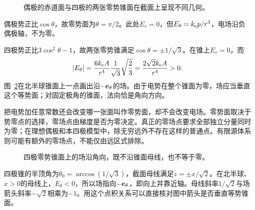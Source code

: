 \begin{figure}[H]\centering
{}
\caption{偶极的赤道面与四极的两张零势锥面在截面上呈现不同几何。}\label{fig:es1-e10-q}
\end{figure}
\begin{solution}
偶极势正比$\cos\theta$，故零势面为$\theta=\pi/2$。此处$E_r=0$，但$E_\theta=k_{\rm e} p/r^3$，电场沿负偶极轴，不为零。

四极势正比$3\cos^2\theta-1$，故两张零势锥满足$\cos\theta=\pm1/\sqrt3$。在锥上$E_r=0$，而
\[|E_\theta|=\frac{6k_{\rm e} A}{r^4}\frac1{\sqrt3}\sqrt{\frac23}
=\frac{2\sqrt2k_{\rm e} A}{r^4}>0.\]
图~\ref{fig:es1-e10-s}在北半球锥面上一点画出沿$-\bm{e}_\theta$的场。由于电势在整个锥面为零，场应当垂直这个等势面；对固定极角的锥面，法向恰是角向方向。

把电势加任意常数还会改变哪一张面叫作零势面，却不会改变电场。零势面取决于势零点的选择，零场点由梯度是否为零决定。真正的零场点要求全部独立分量同时为零；在理想偶极和本四极模型中，除无穷远外不存在这样的普通点。有限源体系则可能有额外的零场点，不能仅由远区式排除。
\begin{figure}[H]\centering
{}
\caption{四极零势锥面上的场沿角向，既不沿锥面母线，也不等于零。}\label{fig:es1-e10-s}
\end{figure}


四极锥的半顶角为$\theta_0=\arccos(1/\sqrt3)$，截面母线满足$z=\pm x/\sqrt2$。在北半球、$x>0$的母线上，$E_\theta<0$，所以场指向$-\bm{e}_\theta$，即向上并靠近轴。母线斜率$1/\sqrt2$与场箭头斜率$-\sqrt2$相乘为$-1$。用这个点积关系可以直接核对图中箭头是否垂直等势锥面。
\end{solution}


